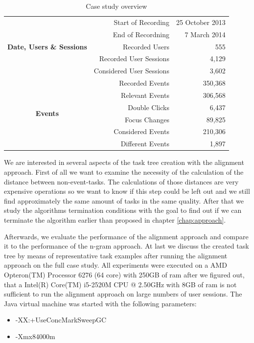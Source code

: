 \begin{table}
	\centering
	\begin{tabular}{c r r}
		\toprule
		\multirow{5}{*}{\textbf{Date, Users \& Sessions}} & Start of Recording & 25 October 2013 \\
		      & End of Recordning & 7 March 2014 \\
		      & Recorded Users & 555 \\
		      & Recorded User Sessions & 4,129 \\
		      & Considered User Sessions & 3,602 \\
		\midrule
		\multirow{6}{*}{\textbf{Events}} & Recorded Events & 350,368 \\
		      & Relevant Events & 306,568 \\
		      & Double Clicks & 6,437 \\
		      & Focus Changes & 89,825 \\
			   & Considered Events & 210,306 \\
			   & Different Events & 1,897 \\
		\bottomrule
	\end{tabular}
	\caption{Case study overview}
	\label{tab:casestudy2}
\end{table}

We are interested in several aspects of the task tree creation with the alignment approach.
First of all we want to examine the necessity of the calculation of the distance between non-event-tasks.
The calculations of those distances are very expensive operations so we want to know if this step could be left out and we still find approximately the same amount of tasks in the same quality.
After that we study the algorithms termination conditions with the goal to find out if we can terminate the algorithm earlier than proposed in chapter \ref{chap:approach}.

Afterwards, we evaluate the performance of the alignment approach and compare it to the performance of the n-gram approach.
At last we discuss the created task tree by means of representative task examples after running the alignment approach on the full case study.
All experiments were executed on a AMD Opteron(TM) Processor 6276 (64 core) with 250GB of ram after we figured out, that a Intel(R) Core(TM) i5-2520M CPU @ 2.50GHz with 8GB of ram is not sufficient to run the alignment approach on large numbers of user sessions.
The Java virtual machine was started with the following parameters:
\begin{itemize}
	\item -XX:+UseConcMarkSweepGC
	\item -Xmx84000m
\end{itemize}

